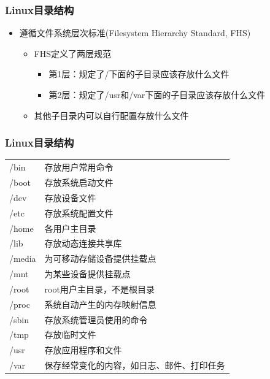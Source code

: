 \documentclass[xcolor=svgnames,presentation]{beamer}
\begin{document}
\begin{frame}
\frametitle{Linux目录结构}
\label{sec-4-2-14}
\begin{itemize}

\item 遵循文件系统层次标准(Filesystem Hierarchy Standard, FHS)
\label{sec-4-2-14-1}%
\begin{itemize}

\item FHS定义了两层规范
\label{sec-4-2-14-1-1}%
\begin{itemize}

\item 第1层：规定了/下面的子目录应该存放什么文件
\label{sec-4-2-14-1-1-1}%

\item 第2层：规定了/usr和/var下面的子目录应该存放什么文件
\label{sec-4-2-14-1-1-2}%
\end{itemize} %

\item 其他子目录内可以自行配置存放什么文件
\label{sec-4-2-14-1-2}%
\end{itemize} %
\end{itemize} %
\end{frame}
\begin{frame}
\frametitle{Linux目录结构}
\label{sec-4-2-15}


\begin{center}
\begin{tabular}{ll}
 /bin    &  存放用户常用命令                            \\
 /boot   &  存放系统启动文件                            \\
 /dev    &  存放设备文件                                \\
 /etc    &  存放系统配置文件                            \\
 /home   &  各用户主目录                                \\
 /lib    &  存放动态连接共享库                          \\
 /media  &  为可移动存储设备提供挂载点                  \\
 /mnt    &  为某些设备提供挂载点                        \\
 /root   &  root用户主目录，不是根目录                  \\
 /proc   &  系统自动产生的内存映射信息                  \\
 /sbin   &  存放系统管理员使用的命令                    \\
 /tmp    &  存放临时文件                                \\
 /usr    &  存放应用程序和文件                          \\
 /var    &  保存经常变化的内容，如日志、邮件、打印任务  \\
\end{tabular}
\end{center}
\end{frame}
\end{document}
